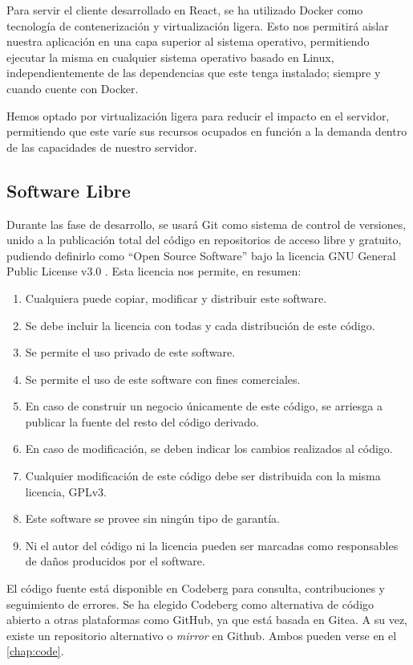 Para servir el cliente desarrollado en React, se ha utilizado Docker como tecnología de contenerización y virtualización ligera. Esto nos permitirá aislar nuestra aplicación en una capa superior al sistema operativo, permitiendo ejecutar la misma en cualquier sistema operativo basado en Linux, independientemente de las dependencias que este tenga instalado; siempre y cuando cuente con Docker.

Hemos optado por virtualización ligera para reducir el impacto en el servidor, permitiendo que este varíe sus recursos ocupados en función a la demanda dentro de las capacidades de nuestro servidor.


\subsection{Software Libre}
\label{tec_hab:foss}

Durante las fase de desarrollo, se usará Git como sistema de control de versiones, unido a la publicación total del código en repositorios de acceso libre y gratuito, pudiendo definirlo como ``Open Source Software'' bajo la licencia GNU General Public License v3.0 \cite{GPLv3}. Esta licencia nos permite, en resumen:

\begin{enumerate}
	\item Cualquiera puede copiar, modificar y distribuir este software.
	\item Se debe incluir la licencia con todas y cada distribución de este código.
	\item Se permite el uso privado de este software.
	\item Se permite el uso de este software con fines comerciales.
	\item En caso de construir un negocio únicamente de este código, se arriesga a publicar la fuente del resto del código derivado.
	\item En caso de modificación, se deben indicar los cambios realizados al código.
	\item Cualquier modificación de este código debe ser distribuida con la misma licencia, GPLv3.
	\item Este software se provee sin ningún tipo de garantía.
	\item Ni el autor del código ni la licencia pueden ser marcadas como responsables de daños producidos por el software.
\end{enumerate}

El código fuente está disponible en Codeberg para consulta, contribuciones y seguimiento de errores. Se ha elegido Codeberg como alternativa de código abierto a otras plataformas como GitHub, ya que está basada en Gitea. A su vez, existe un repositorio alternativo o \textit{mirror} en Github. Ambos pueden verse en el \autoref{chap:code}.


